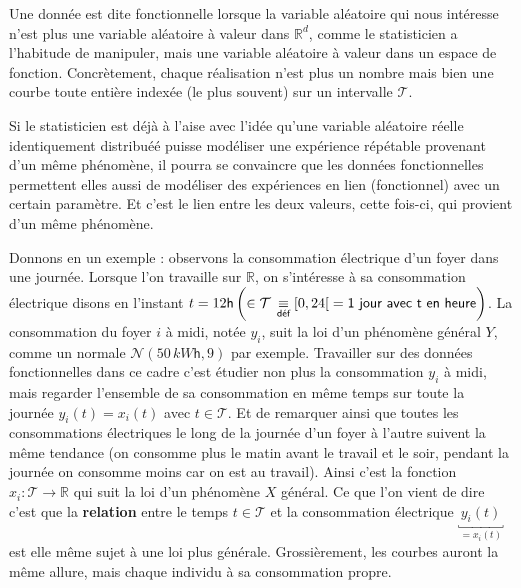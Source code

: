 
Une donnée est dite fonctionnelle lorsque la variable aléatoire qui nous intéresse n'est plus une variable aléatoire à valeur dans $\mathds R^d$, comme le statisticien a l'habitude de manipuler, mais une variable aléatoire à valeur dans un espace de fonction. Concrètement, chaque réalisation n'est plus un nombre mais bien une courbe toute entière indexée (le plus souvent) sur un intervalle $\mathcal T$. 

\smallskip

Si le statisticien est déjà à l'aise avec l'idée qu'une variable aléatoire réelle identiquement distribuéé puisse modéliser une expérience répétable provenant d'un même phénomène, il pourra se convaincre que les données fonctionnelles permettent elles aussi de modéliser des expériences en lien (fonctionnel) avec un certain paramètre. Et c'est le lien entre les deux valeurs, cette fois-ci, qui provient d'un même phénomène. 

\smallskip

Donnons en un exemple : observons la consommation électrique d'un foyer dans une journée. Lorsque l'on travaille sur $\mathds R$, on s'intéresse à sa consommation électrique disons en l'instant $t = 12\mathsf{h} \left(\in \mathcal T \, \isdef [0,24[ \; = \textsf{1 jour avec t en heure}\right)$. La consommation du foyer $i$ à midi, notée $y_i$, suit la loi d'un phénomène général $Y$, comme un normale $\mathcal N\left( 50 \, kW\mathsf h, 9\right)$ par exemple. Travailler sur des données fonctionnelles dans ce cadre c'est étudier non plus la consommation $y_i$ à midi, mais regarder l'ensemble de sa consommation en même temps sur toute la journée $y_i(t) = x_i(t)$ avec $t \in \mathcal T$. Et de remarquer ainsi que toutes les consommations électriques le long de la journée d'un foyer à l'autre suivent la même tendance (on consomme plus le matin avant le travail et le soir, pendant la journée on consomme moins car on est au travail). Ainsi c'est la fonction $x_i : \mathcal T \longrightarrow \mathds R$ qui suit la loi d'un phénomène $X$ général. Ce que l'on vient de dire c'est que la \textbf{relation} entre le temps $t \in \mathcal T$ et la consommation électrique $\underbracket{\, y_i(t) \,}_{= x_i(t)}$ est elle même sujet à une loi plus générale. Grossièrement, les courbes auront la même allure, mais chaque individu à sa consommation propre.

\bigskip

